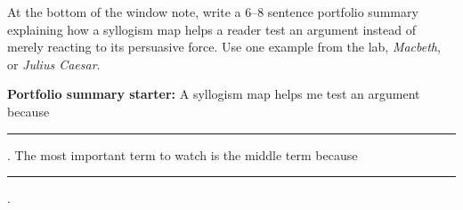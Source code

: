 \documentclass[12pt]{article}
\newcommand{\focusbox}[1]{\par\vspace{0.4em}\noindent\begingroup\setlength{\fboxsep}{6pt}\colorbox{gray!12}{\begin{minipage}{\dimexpr\linewidth-2\fboxsep\relax}#1\end{minipage}}\endgroup\par\vspace{0.5em}}
\begin{document}
At the bottom of the window note, write a 6--8 sentence portfolio summary explaining how a syllogism map helps a reader test an argument instead of merely reacting to its persuasive force. Use one example from the lab, \textit{Macbeth}, or \textit{Julius Caesar}.

\focusbox{\textbf{Portfolio summary starter:} A syllogism map helps me test an argument because \rule{2.2in}{0.4pt}. The most important term to watch is the middle term because \rule{1.8in}{0.4pt}.}

\vspace{1.1in}
\end{document}
